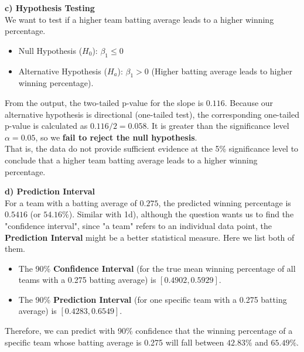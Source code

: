 \documentclass[11pt, a4paper]{article}
\begin{document}
\textbf{c) Hypothesis Testing}\\
We want to test if a higher team batting average leads to a higher winning percentage.
\begin{itemize}
    \item Null Hypothesis ($H_0$): $\beta_1 \le 0$
    \item Alternative Hypothesis ($H_a$): $\beta_1 > 0$ (Higher batting average leads to higher winning percentage).
\end{itemize}
From the output, the two-tailed p-value for the slope is $0.116$. Because our alternative hypothesis is directional (one-tailed test), the corresponding one-tailed p-value is calculated as $0.116 / 2 = 0.058$. It is greater than the significance level $\alpha = 0.05$, so we \textbf{fail to reject the null hypothesis}. \\
That is, the data do not provide sufficient evidence at the 5\% significance level to conclude that a higher team batting average leads to a higher winning percentage.

\textbf{d) Prediction Interval}\\
For a team with a batting average of $0.275$, the predicted winning percentage is $0.5416$ (or $54.16\%$).
Similar with 1d), although the question wants us to find the "confidence interval", since "a team" refers to an individual data point, the \textbf{Prediction Interval} might be a better statistical measure. Here we list both of them.
\begin{itemize}
    \item The 90\% \textbf{Confidence Interval} (for the true mean winning percentage of all teams with a 0.275 batting average) is $[0.4902, 0.5929]$.
    \item The 90\% \textbf{Prediction Interval} (for one specific team with a 0.275 batting average) is $[0.4283, 0.6549]$.
\end{itemize}
Therefore, we can predict with 90\% confidence that the winning percentage of a specific team whose batting average is 0.275 will fall between $42.83\%$ and $65.49\%$.
\end{document}

